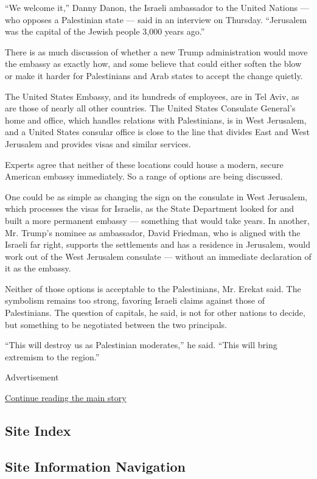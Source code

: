 ``We welcome it,'' Danny Danon, the Israeli ambassador to the United
Nations --- who opposes a Palestinian state --- said in an interview on
Thursday. ``Jerusalem was the capital of the Jewish people 3,000 years
ago.''

There is as much discussion of whether a new Trump administration would
move the embassy as exactly how, and some believe that could either
soften the blow or make it harder for Palestinians and Arab states to
accept the change quietly.

The United States Embassy, and its hundreds of employees, are in Tel
Aviv, as are those of nearly all other countries. The United States
Consulate General's home and office, which handles relations with
Palestinians, is in West Jerusalem, and a United States consular office
is close to the line that divides East and West Jerusalem and provides
visas and similar services.

Experts agree that neither of these locations could house a modern,
secure American embassy immediately. So a range of options are being
discussed.

One could be as simple as changing the sign on the consulate in West
Jerusalem, which processes the visas for Israelis, as the State
Department looked for and built a more permanent embassy --- something
that would take years. In another, Mr. Trump's nominee as ambassador,
David Friedman, who is aligned with the Israeli far right, supports the
settlements and has a residence in Jerusalem, would work out of the West
Jerusalem consulate --- without an immediate declaration of it as the
embassy.

Neither of those options is acceptable to the Palestinians, Mr. Erekat
said. The symbolism remains too strong, favoring Israeli claims against
those of Palestinians. The question of capitals, he said, is not for
other nations to decide, but something to be negotiated between the two
principals.

``This will destroy us as Palestinian moderates,'' he said. ``This will
bring extremism to the region.''

Advertisement

\protect\hyperlink{after-bottom}{Continue reading the main story}

\hypertarget{site-index}{%
\subsection{Site Index}\label{site-index}}

\hypertarget{site-information-navigation}{%
\subsection{Site Information
Navigation}\label{site-information-navigation}}


